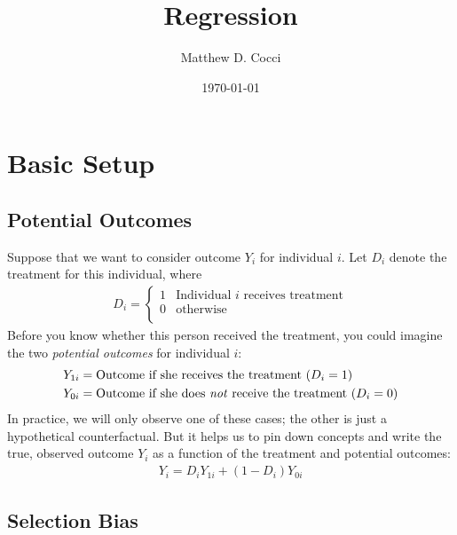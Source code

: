 \documentclass[12pt]{article}
\author{Matthew D. Cocci}
\title{Regression}
\date{\today}
\theoremstyle{plain}
\theoremstyle{definition}
\theoremstyle{remark}
\begin{document}
\maketitle

\section{Basic Setup}

\subsection{Potential Outcomes}

Suppose that we want to consider outcome $Y_i$ for individual $i$.
Let $D_i$ denote the treatment for this individual, where
\begin{align*}
  D_i =
  \begin{cases}
    1 & \text{Individual $i$ receives treatment} \\
    0 & \text{otherwise} \\
  \end{cases}
\end{align*}
Before you know whether this person received the treatment, you could
imagine the two \emph{potential outcomes} for individual $i$:
\begin{align*}
  Y_{1i}
  &= \text{Outcome if she receives the treatment ($D_i=1$)} \\
  Y_{0i}
  &= \text{Outcome if she does \emph{not} receive the treatment ($D_i=0$)}
\end{align*}
In practice, we will only observe one of these cases; the other is just
a hypothetical counterfactual. But it helps us to pin down concepts and
write the true, observed outcome $Y_i$ as a function of the treatment
and potential outcomes:
\begin{align}
  Y_i = D_i Y_{1i} + (1 - D_i) Y_{0i}
  \label{potential}
\end{align}

\subsection{Selection Bias}
\end{document}

